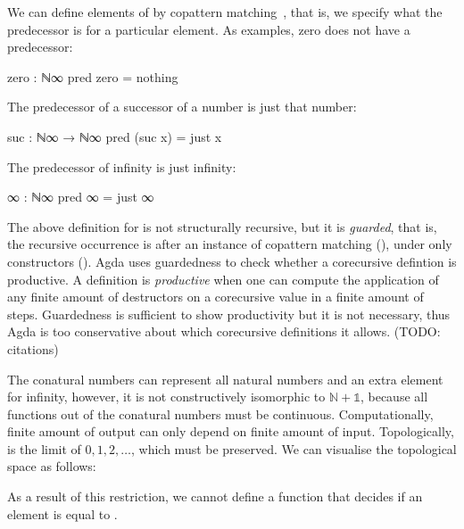 We can define elements of  by copattern
matching~\cite{abel-copatterns}, that is, we specify what the predecessor is for
a particular element. As examples, zero does not have a predecessor:
\begin{code}
zero : ℕ∞
pred zero = nothing
\end{code}
The predecessor of a successor of a number is just that number:
\begin{code}
suc : ℕ∞ → ℕ∞
pred (suc x) = just x
\end{code}
The predecessor of infinity is just infinity:
\begin{code}
∞ : ℕ∞
pred ∞ = just ∞
\end{code}
The above definition for  is not structurally recursive, but it
is \emph{guarded}, that is, the recursive occurrence is after an instance of
copattern matching (), under only constructors
(). Agda uses guardedness to check whether a
corecursive defintion is productive. A definition is \emph{productive} when one
can compute the application of any finite amount of destructors on a corecursive
value in a finite amount of steps. Guardedness is sufficient to show
productivity but it is not necessary, thus Agda is too conservative about which
corecursive definitions it allows. (TODO: citations)

The conatural numbers can represent all natural numbers and an extra element for
infinity, however, it is not constructively isomorphic to $\mathbb{N} +
\mathbb{1}$, because all functions out of the conatural numbers must be
continuous. Computationally, finite amount of output can only depend on finite
amount of input. Topologically,  is the limit of $0, 1, 2,
\dots$, which must be preserved. We can visualise the topological space as
follows:
\begin{center}
\end{center}
As a result of this restriction, we cannot define a function that decides if an
element is equal to .

